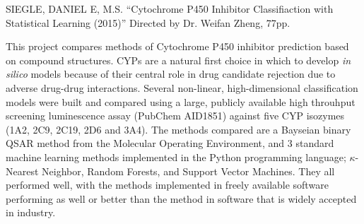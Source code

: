 SIEGLE, DANIEL E, M.S.
``Cytochrome P450 Inhibitor Classifiaction with Statistical Learning (2015)'' Directed by Dr. Weifan Zheng, 77pp.

This project compares methods of Cytochrome P450 inhibitor prediction based on compound structures. CYPs are a natural first choice in which to  develop \textit{in silico} models because of their central role in drug candidate rejection due to adverse drug-drug interactions. Several non-linear, high-dimensional classification models were built and compared using a large, publicly available high throuhput screening luminescence assay (PubChem AID1851) against five CYP isozymes (1A2, 2C9, 2C19, 2D6 and 3A4). The methods compared are a Bayseian binary QSAR method from the Molecular Operating Environment, and 3 standard machine learning methods implemented in the Python programming language; $\kappa$-Nearest Neighbor, Random Forests, and Support Vector Machines. They all performed well, with the methods implemented in freely available software performing as well or better than the method in software that is widely accepted in industry. 
